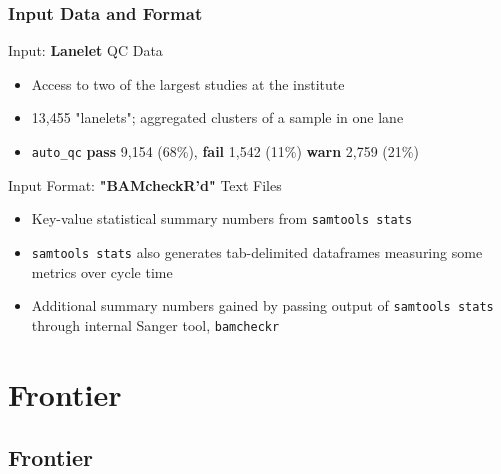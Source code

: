 \documentclass{beamer}
\begin{document}
\begin{frame}[t]
\frametitle{Input Data and Format}
    \begin{beamerboxesrounded}[shadow=true]{}
        \begin{center}
            Input: \textbf{Lanelet} QC Data
        \end{center}
    \end{beamerboxesrounded}
    \begin{itemize}
        \item Access to two of the largest studies at the institute
        \item 13,455 "lanelets"; aggregated clusters of a sample in one lane
        \item \texttt{auto\_qc} \textbf{pass} 9,154 (68\%),
            \textbf{fail} 1,542 (11\%) \textbf{warn} 2,759 (21\%)
    \end{itemize}

    \vskip 0.5cm

    \begin{beamerboxesrounded}[shadow=true]{}
        \begin{center}
            Input Format: \textbf{"BAMcheckR'd"} Text Files
        \end{center}
    \end{beamerboxesrounded}
    \begin{itemize}
        \item Key-value statistical summary numbers from \texttt{samtools stats}
        \item \texttt{samtools stats} also generates tab-delimited dataframes
            measuring some metrics over cycle time
        \item Additional summary numbers gained by passing output of
            \texttt{samtools stats} through internal Sanger tool, \texttt{bamcheckr}
    \end{itemize}
\end{frame}


\section{Frontier}
\subsection{Frontier}
\end{document}
